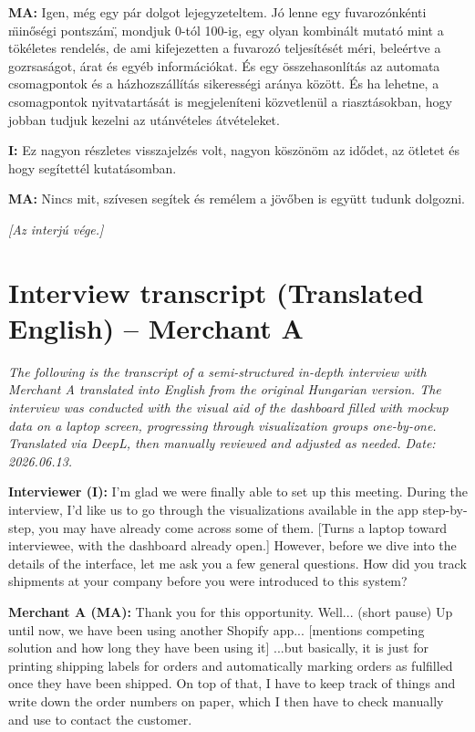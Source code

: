 \documentclass{imc-inf}
\begin{document}
\begin{appendices}
  \noindent\textbf{MA:} Igen, még egy pár dolgot lejegyzeteltem. Jó lenne egy fuvarozónkénti \"minőségi pontszám\", mondjuk 0-tól 100-ig, egy olyan kombinált mutató mint a tökéletes rendelés, de ami kifejezetten a fuvarozó teljesítését méri, beleértve a gozrsaságot, árat és egyéb információkat. És egy összehasonlítás az automata csomagpontok és a házhozszállítás sikerességi aránya között. És ha lehetne, a csomagpontok nyitvatartását is megjeleníteni közvetlenül a riasztásokban, hogy jobban tudjuk kezelni az utánvételes átvételeket.

  \noindent\textbf{I:} Ez nagyon részletes visszajelzés volt, nagyon köszönöm az idődet, az ötletet és hogy segítettél kutatásomban.

  \noindent\textbf{MA:} Nincs mit, szívesen segítek és remélem a jövőben is együtt tudunk dolgozni.

  \bigskip
  \noindent\textit{[Az interjú vége.]}


  \chapter{Interview transcript (Translated English) -- Merchant A}
  \label{app:interview-merchant-a-english}

  \noindent\textit{The following is the transcript of a semi-structured in-depth interview with Merchant A translated into English from the original Hungarian version. The interview was conducted with the visual aid of the dashboard filled with mockup data on a laptop screen, progressing through visualization groups one-by-one. Translated via DeepL, then manually reviewed and adjusted as needed. Date: 2026.06.13.}

  \bigskip
  \noindent\textbf{Interviewer (I):} I'm glad we were finally able to set up this meeting. During the interview, I'd like us to go through the visualizations available in the app step-by-step, you may have already come across some of them. [Turns a laptop toward interviewee, with the dashboard already open.] However, before we dive into the details of the interface, let me ask you a few general questions. How did you track shipments at your company before you were introduced to this system?

  \noindent\textbf{Merchant A (MA):} Thank you for this opportunity. Well... (short pause) Up until now, we have been using another Shopify app... [mentions competing solution and how long they have been using it] ...but basically, it is just for printing shipping labels for orders and automatically marking orders as fulfilled once they have been shipped. On top of that, I have to keep track of things and write down the order numbers on paper, which I then have to check manually and use to contact the customer.


\end{appendices}
\end{document}
